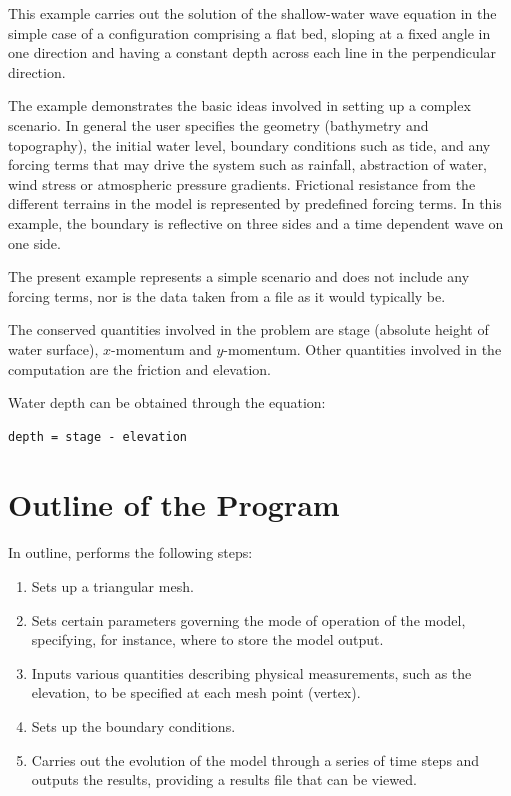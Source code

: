 \documentclass{manual}
\begin{document}
This example carries out the solution of the shallow-water wave
equation in the simple case of a configuration comprising a flat
bed, sloping at a fixed angle in one direction and having a
constant depth across each line in the perpendicular direction.

The example demonstrates the basic ideas involved in setting up a
complex scenario. In general the user specifies the geometry
(bathymetry and topography), the initial water level, boundary
conditions such as tide, and any forcing terms that may drive the
system such as rainfall, abstraction of water, wind stress or atmospheric pressure gradients.
Frictional resistance from the different terrains in the model is
represented by predefined forcing terms. In this example, the
boundary is reflective on three sides and a time dependent wave on
one side.

The present example represents a simple scenario and does not
include any forcing terms, nor is the data taken from a file as it
would typically be.

The conserved quantities involved in the
problem are stage (absolute height of water surface),
$x$-momentum and $y$-momentum. Other quantities
involved in the computation are the friction and elevation.

Water depth can be obtained through the equation:

\begin{verbatim}
depth = stage - elevation
\end{verbatim}

\section{Outline of the Program}

In outline,  performs the following steps:
\begin{enumerate}
   \item Sets up a triangular mesh.
   \item Sets certain parameters governing the mode of
         operation of the model, specifying, for instance,
         where to store the model output.
   \item Inputs various quantities describing physical measurements, such
         as the elevation, to be specified at each mesh point (vertex).
   \item Sets up the boundary conditions.
   \item Carries out the evolution of the model through a series of time
         steps and outputs the results, providing a results file that can
         be viewed.
\end{enumerate}
\end{document}
